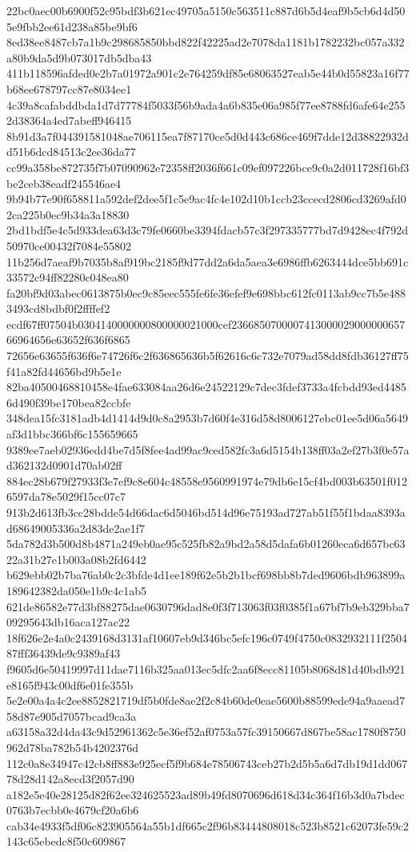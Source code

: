 {22bc0aec00b6900f52c95bdf3b621ec49705a5150c563511c887d6b5d4eaf9b5cb6d4d505e9fbb2ee61d238a85be9bf6
8ed38ee8487cb7a1b9c298685850bbd822f42225ad2e7078da1181b1782232bc057a332a80b9da5d9b073017db5dba43
411b118596afded0e2b7a01972a901c2e764259df85e68063527eab5e44b0d55823a16f77b68ee678797cc87e8034ee1
4c39a8cafabddbda1d7d77784f5033f56b9ada4a6b835e06a985f77ee8788fd6afe64e2552d38364a4ed7abeff946415
8b91d3a7f044391581048ae706115ea7f87170ce5d0d443c686ce469f7dde12d38822932dd51b6dcd84513c2ee36da77
cc99a358be872735f7b07090962e72358ff2036f661c09ef097226bce9c0a2d011728f16bf3be2ceb38eadf245546ae4
9b94b77e90f658811a592def2dee5f1c5e9ac4fc4e102d10b1ccb23ccecd2806cd3269afd02ca225b0ec9b34a3a18830
2bd1bdf5e4c5d933dea63d3c79fe0660be3394fdacb57c3f297335777bd7d9428ec4f792d50970ce00432f7084e55802
11b256d7aeaf9b7035b8af919bc2185f9d77dd2a6da5aea3e6986ffb6263444dce5bb691c33572c94ff82280c048ea80
fa20bf9d03abec0613875b0ec9c85eec555fe6fe36efef9e698bbc612fc0113ab9cc7b5e4883493cd8bdbf0f2ffffef2
ecdf67ff07504b0304140000000800000021000cef236685070000741300002900000065766964656e63652f636f6865
72656e63655f636f6e74726f6c2f636865636b5f62616c6c732e7079ad58dd8fdb36127ff75f41a82fd44656bd9b5e1e
82ba40500468810458e4fae633084aa26d6e24522129c7dec3fdef3733a4fcbdd93ed44856d490f39be170bea82ccbfe
348dea15fc3181adb4d1414d9d0c8a2953b7d60f4e316d58d8006127ebc01ee5d06a5649af3d1bbc366bf6c155659665
9389ee7aeb02936edd4be7d5f8fee4ad99ac9ced582fc3a6d5154b138ff03a2ef27b3f0e57ad362132d0901d70ab02ff
884ec28b679f27933f3e7ef9c8e604c48558e9560991974e79db6e15cf4bd003b63501f0126597da78e5029f15cc07c7
913b2d613fb3cc28bdde54d66dac6d5046bd514d96e75193ad727ab51f55f1bdaa8393ad68649005336a2d83de2ae1f7
5da782d3b500d8b4871a249eb0ae95c525fb82a9bd2a58d5dafa6b01260eca6d657bc6322a31b27e1b003a08b2fd6442
b629ebb02b7ba76ab0c2c3bfde4d1ee189f62e5b2b1bcf698bb8b7ded9606bdb963899a189642382da050e1b9c4c1ab5
621de86582e77d3bf88275dae0630796dad8e0f3f713063f03f0385f1a67bf7b9eb329bba709295643db16aca127ac22
18f626e2e4a0c2439168d3131af10607eb9d346bc5efc196c0749f4750c0832932111f250487fff36439de9c9389af43
f9605d6e50419997d11dae7116b325aa013ec5dfc2aa6f8ecc81105b8068d81d40bdb921e8165f943c00df6e01fe355b
5e2e00a4a4c2ee8852821719df5b0fde8ae2f2c84b60de0eae5600b88599ede94a9aaead758d87e905d7057bcad9ca3a
a63158a32d4da43c9d52961362c5e36ef52af0753a57fc39150667d867be58ac1780f8750962d78ba782b54b4202376d
112c0a8e34947c42cb8ff883e925ecf5f9b684e78506743ceb27b2d5b5a6d7db19d1dd06778d28d142a8ecd3f2057d90
a182e5e40e28125d82f62ee324625523ad89b49fd8070696d618d34c364f16b3d0a7bdec0763b7ecbb0e4679cf20a6b6
cab34e4933f5df06c823905564a55b1df665c2f96b83444808018c523b8521c62073fe59c2143c65ebedc8f50c609867
}
